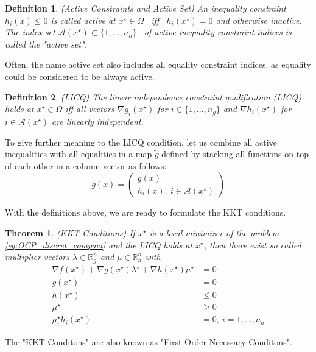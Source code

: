 \documentclass  [
  paper    = a4,
  BCOR     = 10mm,
  twoside,
  fontsize = 12pt,
  fleqn,
  toc      = bibnumbered,
  toc      = listofnumbered,
  numbers  = noendperiod,
  headings = normal,
  listof   = leveldown,
  version  = 3.03
]                                       {scrreprt}
\newcommand{\<}{\langle}
\renewcommand{\>}{\rangle}
\newtheorem{theorem}{Theorem}
\newtheorem{definition}{Definition}
\begin{document}
\begin{definition}(Active Constraints and Active Set) An inequality constraint $h_i(x) \leq 0$ is called active at $x^\star \in  \Omega$  iff  $h_i(x^\star) = 0$ and otherwise inactive. The index set $\mathcal{A}(x^\star) \subset \{1, ..., n_h\}$  of active inequality constraint indices is called the "active set".
\end{definition}
Often, the name active set also includes all equality constraint indices, as equality could be considered to be always active. 
\begin{definition} (LICQ) The linear independence constraint qualification (LICQ) holds at $x^\star \in  \Omega $ iff all vectors $\nabla g_i(x^\star)$ for $i \in \{1, ..., n_g \}$ and $\nabla h_i(x^\star)$ for  $i \in \mathcal{A}(x^\star)$ are linearly independent.
	\label{df_LICO}
\end{definition}
To give further meaning to the LICQ condition, let us combine all active inequalities with all equalities in a map $\tilde{g}$ defined by stacking all functions on top of each other in a column vector as follows:
\begin{equation}
	\tilde{g}(x) =  \begin{pmatrix} g(x) \\ h_i(x), \ i \in \mathcal{A}(x^\star)    \end{pmatrix}
\end{equation}



With the definitions above, we are ready to formulate the KKT conditions. 
\begin{theorem}(KKT Conditions)
	If $x^\star$ is a local minimizer of the problem \ref{eq:OCP_discret_compact} and the LICQ holds at $x^\star$, then there exist
	so called multiplier vectors $\lambda \in \mathbb{R}^n_g$ and $\mu \in \mathbb{R}^n_h$ with 
	\begin{subequations}
		\begin{align}
			\nabla f(x^\star) + \nabla g(x^\star) \lambda^\star +  \nabla h(x^\star) \mu^\star &= 0 \\
			g(x^\star)	 &= 0   \\
			h(x^\star)	&\leq 0  \label{kkt_smaller}\\
			\mu^\star & \geq 0 \\
			\mu_i^\star  h_i(x^\star) &=0 , \  i = 1, ..., n_h \label{kkt_active}
		\end{align}
	\end{subequations}
	\label{TH_KKT}
\end{theorem}
The "KKT Conditons" are also known as "First-Order Necessary Conditons". 
\end{document}
